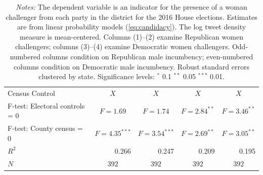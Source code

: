 \documentclass[manuscript,screen,nonacm,11pt,acm]{acmart}
\begin{document}
\begin{bibunit}
\begin{table}[ht]
\begin{adjustbox}{max width=1\textwidth}
\begin{tabular}{@{\hspace{0\tabcolsep}}l*{4}{D{.}{.}{-1}}@{\hspace{0\tabcolsep}}}
Census Control      &         &         &         &         \\
F-test: Electoral controls = 0&         &         &         &         \\
F-test: County census = 0&         &         &         &         \\
$ R^2 $             &   0.266         &   0.247         &   0.209         &   0.195         \\
$ N $               &         &         &         &         \\
			\bottomrule
		\end{tabular}
	\end{adjustbox}
	\caption*{
		\footnotesize
		\emph{Notes:}
		The dependent variable is an indicator for the presence of a woman challenger from each party in the district for the 2016 House elections.
		Estimates are from linear probability models (\cref{eq:candidacy}).
		The log tweet density measure is mean-centered.
		Columns (1)--(2) examine Republican women challengers; columns (3)--(4) examine Democratic women challengers.
		Odd-numbered columns condition on Republican male incumbency; even-numbered columns condition on Democratic male incumbency.
		Robust standard errors clustered by state.
		Significance levels: $^*$ 0.1 $^{**}$ 0.05 $^{***}$ 0.01.
	}
\end{table}

\clearpage
\FloatBarrier

\end{bibunit}
\end{document}
